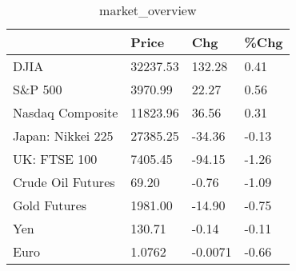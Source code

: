 \documentclass{article}%
\begin{document}
%


\begin{table}[htbp]%
\caption{market\_overview}%
\centering%
\begin{adjustbox}{width=1\textwidth}%
\begin{tabular}{llll}
\toprule
                  &    Price &     Chg &  \%Chg \\
\midrule
             DJIA & 32237.53 &  132.28 &  0.41 \\
          S\&P 500 &  3970.99 &   22.27 &  0.56 \\
 Nasdaq Composite & 11823.96 &   36.56 &  0.31 \\
Japan: Nikkei 225 & 27385.25 &  -34.36 & -0.13 \\
     UK: FTSE 100 &  7405.45 &  -94.15 & -1.26 \\
Crude Oil Futures &    69.20 &   -0.76 & -1.09 \\
     Gold Futures &  1981.00 &  -14.90 & -0.75 \\
              Yen &   130.71 &   -0.14 & -0.11 \\
             Euro &   1.0762 & -0.0071 & -0.66 \\
\bottomrule
\end{tabular}
%
\end{adjustbox}%
\end{table}

%
\end{document}
